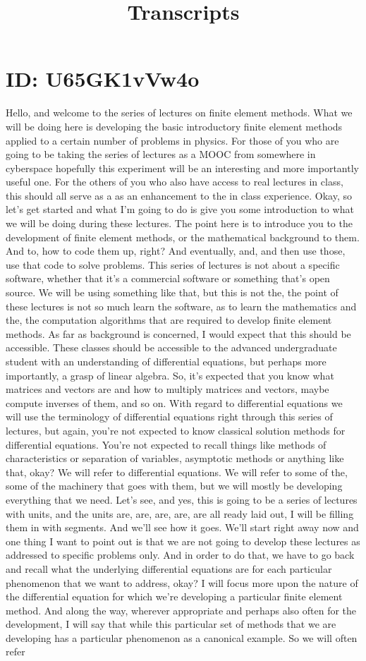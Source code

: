 \documentclass[10pt]{article}
\title{Transcripts}
\date{}
\begin{document}
\section*{ID: U65GK1vVw4o}
Hello, and welcome to the series of lectures on finite element methods. What we will be doing here is developing the basic introductory finite element methods applied to a certain number of problems in physics. For those of you who are going to be taking the series of lectures as a MOOC from somewhere in cyberspace hopefully this experiment will be an interesting and more importantly useful one. For the others of you who also have access to real lectures in class, this should all serve as a as an enhancement to the in class experience. Okay, so let's get started and what I'm going to do is give you some introduction to what we will be doing during these lectures. The point here is to introduce you to the development of finite element methods, or the mathematical background to them. And to, how to code them up, right? And eventually, and, and then use those, use that code to solve problems. This series of lectures is not about a specific software, whether that it's a commercial software or something that's open source. We will be using something like that, but this is not the, the point of these lectures is not so much learn the software, as to learn the mathematics and the, the computation algorithms that are required to develop finite element methods. As far as background is concerned, I would expect that this should be accessible. These classes should be accessible to the advanced undergraduate student with an understanding of differential equations, but perhaps more importantly, a grasp of linear algebra. So, it's expected that you know what matrices and vectors are and how to multiply matrices and vectors, maybe compute inverses of them, and so on. With regard to differential equations we will use the terminology of differential equations right through this series of lectures, but again, you're not expected to know classical solution methods for differential equations. You're not expected to recall things like methods of characteristics or separation of variables, asymptotic methods or anything like that, okay? We will refer to differential equations. We will refer to some of the, some of the machinery that goes with them, but we will mostly be developing everything that we need. Let's see, and yes, this is going to be a series of lectures with units, and the units are, are, are, are, are all ready laid out, I will be filling them in with segments. And we'll see how it goes. We'll start right away now and one thing I want to point out is that we are not going to develop these lectures as addressed to specific problems only. And in order to do that, we have to go back and recall what the underlying differential equations are for each particular phenomenon that we want to address, okay? I will focus more upon the nature of the differential equation for which we're developing a particular finite element method. And along the way, wherever appropriate and perhaps also often for the development, I will say that while this particular set of methods that we are developing has a particular phenomenon as a canonical example. So we will often refer 
\end{document}
